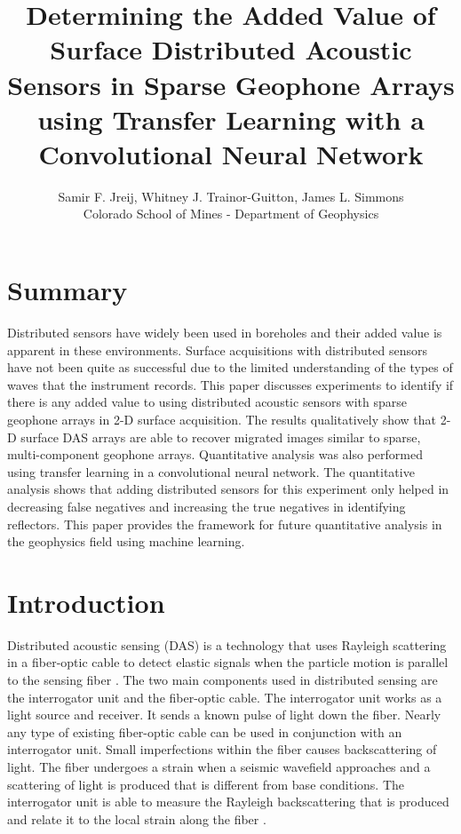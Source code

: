 

\title{Determining the Added Value of Surface Distributed Acoustic Sensors in Sparse Geophone Arrays using Transfer Learning with a Convolutional Neural Network}
\author{Samir F. Jreij, Whitney J. Trainor-Guitton, James L. Simmons \\Colorado School of Mines - Department of Geophysics}
\maketitle

\section{Summary}
Distributed sensors have widely been used in boreholes and their added value is apparent in these environments. Surface acquisitions with distributed sensors have not been quite as successful due to the limited understanding of the types of waves that the instrument records. This paper discusses experiments to identify if there is any added value to using distributed acoustic sensors with sparse geophone arrays in 2-D surface acquisition. The results qualitatively show that 2-D surface DAS arrays are able to recover migrated images similar to sparse, multi-component geophone arrays. Quantitative analysis was also performed using transfer learning in a convolutional neural network. The quantitative analysis shows that adding distributed sensors for this experiment only helped in decreasing false negatives and increasing the true negatives in identifying reflectors. This paper provides the framework for future quantitative analysis in the geophysics field using machine learning.

\section{Introduction}
Distributed acoustic sensing (DAS) is a technology that uses Rayleigh scattering in a fiber-optic cable to detect elastic signals when the particle motion is parallel to the sensing fiber \citep{hornman2013field}. The two main components used in distributed sensing are the interrogator unit and the fiber-optic cable. The interrogator unit works as a light source and receiver. It sends a known pulse of light down the fiber. Nearly any type of existing fiber-optic cable can be used in conjunction with an interrogator unit. Small imperfections within the fiber causes backscattering of light. The fiber undergoes a strain when a seismic wavefield approaches and a scattering of light is produced that is different from base conditions. The interrogator unit is able to measure the Rayleigh backscattering that is produced and relate it to the local strain along the fiber \citep{Parker2014}.

